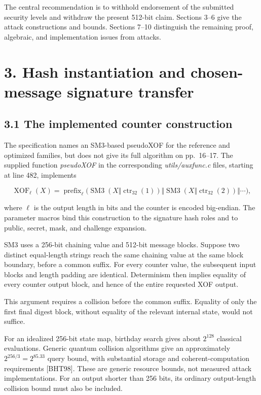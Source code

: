 \documentclass[
  american,
  10pt,
  a4paper,
]{article}
\begin{document}
The central recommendation is to withhold endorsement of the submitted
security levels and withdraw the present 512-bit claim. Sections 3--6
give the attack constructions and bounds. Sections 7--10 distinguish the
remaining proof, algebraic, and implementation issues from attacks.

\section{3. Hash instantiation and chosen-message signature
transfer}\label{hash-instantiation-and-chosen-message-signature-transfer}

\subsection{3.1 The implemented counter
construction}\label{the-implemented-counter-construction}

The specification names an SM3-based pseudoXOF for the reference and
optimized families, but does not give its full algorithm on pp.~16--17.
The supplied function \emph{pseudoXOF} in the corresponding
\emph{utils/auxfunc.c} files, starting at line 482, implements

\[
\operatorname{XOF}_{\ell}(X)=
\operatorname{prefix}_{\ell}\big(
\operatorname{SM3}(X\Vert\operatorname{ctr}_{32}(1))
\Vert\operatorname{SM3}(X\Vert\operatorname{ctr}_{32}(2))
\Vert\cdots\big),
\]

where \(\ell\) is the output length in bits and the counter is encoded
big-endian. The parameter macros bind this construction to the signature
hash roles and to public, secret, mask, and challenge expansion.

SM3 uses a 256-bit chaining value and 512-bit message blocks. Suppose
two distinct equal-length strings reach the same chaining value at the
same block boundary, before a common suffix. For every counter value,
the subsequent input blocks and length padding are identical.
Determinism then implies equality of every counter output block, and
hence of the entire requested XOF output.

This argument requires a collision before the common suffix. Equality of
only the first final digest block, without equality of the relevant
internal state, would not suffice.

For an idealized 256-bit state map, birthday search gives about
\(2^{128}\) classical evaluations. Generic quantum collision algorithms
give an approximately \(2^{256/3}=2^{85.33}\) query bound, with
substantial storage and coherent-computation requirements {[}BHT98{]}.
These are generic resource bounds, not measured attack implementations.
For an output shorter than 256 bits, its ordinary output-length
collision bound must also be included.
\end{document}

